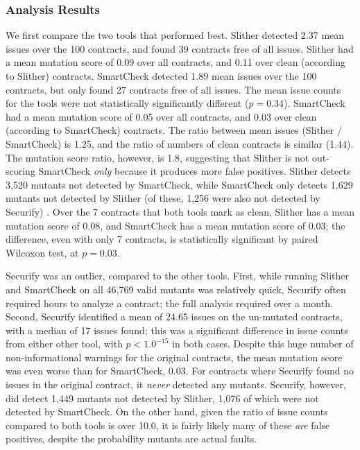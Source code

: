 \subsubsection{Analysis Results}

We first compare the two tools that performed best.  Slither detected 2.37 mean issues over the 100 contracts, and found 39 contracts free of all issues.  Slither had a mean mutation score of 0.09 over all contracts, and 0.11 over clean (according to Slither) contracts.  SmartCheck detected 1.89 mean issues over the 100 contracts, but only found 27 contracts free of all issues.  The mean issue counts for the tools were not statistically significantly different ($p=0.34$).  SmartCheck had a mean mutation score of 0.05 over all contracts, and 0.03 over clean (according to SmartCheck) contracts.  The ratio between mean issues (Slither / SmartCheck) is 1.25, and the ratio of numbers of clean contracts is similar (1.44).  The mutation score ratio, however, is 1.8, suggesting that Slither is not out-scoring SmartCheck \emph{only} because it produces more false positives.  Slither detects 3,520 mutants not detected by SmartCheck, while SmartCheck only detects 1,629 mutants not detected by Slither (of these, 1,256 were also not detected by Securify) .  Over the 7 contracts that both tools mark as clean, Slither has a mean mutation score of 0.08, and SmartCheck has a mean mutation score of 0.03; the difference, even with only 7 contracts, is statistically significant by paired Wilcoxon test, at $p=0.03$.

Securify was an outlier, compared to the other tools.  First, while running Slither and SmartCheck on all 46,769 valid mutants was relatively quick, Securify often required hours to analyze a contract; the full analysis required over a month.  Second, Securify identified a mean of 24.65 issues on the un-mutated contracts, with a median of 17 issues found; this was a significant difference in issue counts from either other tool, with $p<1.0^{-15}$ in both cases.  Despite this huge number of non-informational warnings for the original contracts, the mean mutation score was even worse than for SmartCheck, 0.03.  For contracts where Securify found no issues in the original contract, it \emph{never} detected any mutants. Securify, however, did detect 1,449 mutants not detected by Slither, 1,076 of which were not detected by SmartCheck.  On the other hand, given the ratio of issue counts compared to both tools is over 10.0, it is fairly likely many of these \emph{are} false positives, despite the probability mutants are actual faults.

